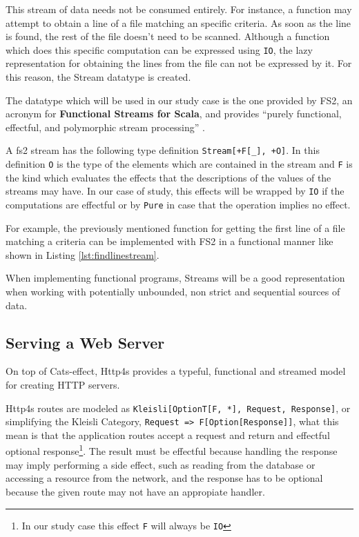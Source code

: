 \documentclass[../main.tex]{subfiles}
\begin{document}
This stream of data needs not be consumed entirely. For instance, a function may attempt to
obtain a line of a file matching an specific criteria. As soon as the line is
found, the rest of the file doesn't need to be scanned. Although a function which does
this specific computation can be expressed using \texttt{IO}, the lazy
representation for obtaining the lines from the file can not be expressed by it. For this
reason, the Stream datatype is created.

The datatype which will be used in our study case is the one provided by FS2,
an acronym for \textbf{Functional Streams for Scala}, and provides ``purely
functional, effectful, and polymorphic stream processing'' \autocite{Fs2:Home}.

A fs2 stream has the following type definition \texttt{Stream[+F[\_], +O]}. In
this definition \texttt{O} is the type of the elements which are contained in
the stream and \texttt{F} is the kind which evaluates the effects that the
descriptions of the values of the streams may have. In our case of study, this
effects will be wrapped by \texttt{IO} if the computations are effectful or by
\texttt{Pure} in case that the operation implies no effect.

For example, the previously mentioned function for getting the first line of a
file matching a criteria can be implemented with FS2 in a functional manner like
shown in Listing \ref{lst:findlinestream}.



When implementing functional programs, Streams will be a good representation when working with
potentially unbounded, non strict and sequential sources of data.

\subsection{Serving a Web Server}
On top of Cats-effect, Http4s provides a typeful, functional and streamed model
for creating HTTP servers.

Http4s routes are modeled as \mbox{\texttt{Kleisli[OptionT[F,
*], Request, Response]}}, or simplifying the Kleisli Category, \mbox{\lstinline{Request => F[Option[Response]]}},
what this mean is that the application routes accept a request and return and
effectful optional response\footnote{In our study case this effect \texttt{F}
  will always be \texttt{IO}}. The result must be effectful because handling the
response may imply performing a side effect, such as reading from the database or
accessing a resource from the network, and the response has to be optional
because the given route may not have an appropiate handler.
\end{document}

